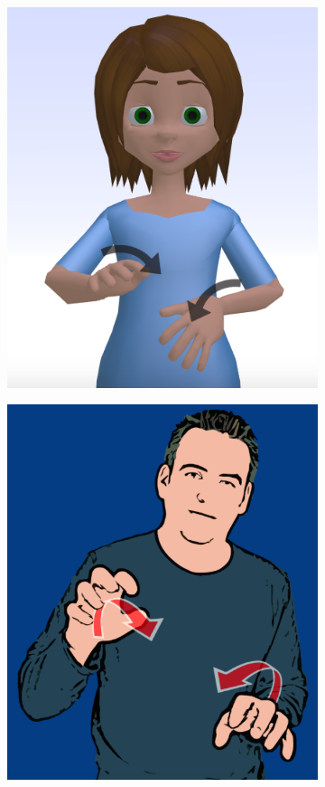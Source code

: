 \documentclass[12pt]{ociamthesis}  %
\begin{document}
\begin{figure}[H]
\centering
\begin{subfigure}[b]{.5\textwidth}
	\captionsetup{width=0.8\textwidth}
  \centering
  \includegraphics[width=0.7\linewidth]{chapter6/animal2}
  \caption{}
\end{subfigure}%
\begin{subfigure}[b]{.5\textwidth}
 \captionsetup{width=0.8\textwidth}
  \centering
  \includegraphics[width=0.7\linewidth]{chapter6/animal1}
  \caption{}
\end{subfigure}
\label{fig:storyboard}
\end{figure}
\end{document}
